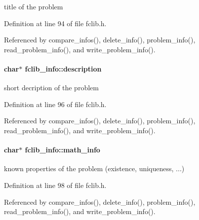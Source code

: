 title of the problem 



Definition at line 94 of file fclib.\-h.



Referenced by compare\-\_\-infos(), delete\-\_\-info(), problem\-\_\-info(), read\-\_\-problem\-\_\-info(), and write\-\_\-problem\-\_\-info().

\hypertarget{structfclib__info_a0c1680fee67eaf7b20c436a775d4f35d}{
\paragraph[{description}]{\setlength{\rightskip}{0pt plus 5cm}char$\ast$ fclib\-\_\-info\-::description}}\label{structfclib__info_a0c1680fee67eaf7b20c436a775d4f35d}


short decription of the problem 



Definition at line 96 of file fclib.\-h.



Referenced by compare\-\_\-infos(), delete\-\_\-info(), problem\-\_\-info(), read\-\_\-problem\-\_\-info(), and write\-\_\-problem\-\_\-info().

\hypertarget{structfclib__info_ad6dadb3af34a719e5ec3cab2d499c7f2}{
\paragraph[{math\-\_\-info}]{\setlength{\rightskip}{0pt plus 5cm}char$\ast$ fclib\-\_\-info\-::math\-\_\-info}}\label{structfclib__info_ad6dadb3af34a719e5ec3cab2d499c7f2}


known properties of the problem (existence, uniqueness, ...) 



Definition at line 98 of file fclib.\-h.



Referenced by compare\-\_\-infos(), delete\-\_\-info(), problem\-\_\-info(), read\-\_\-problem\-\_\-info(), and write\-\_\-problem\-\_\-info().

